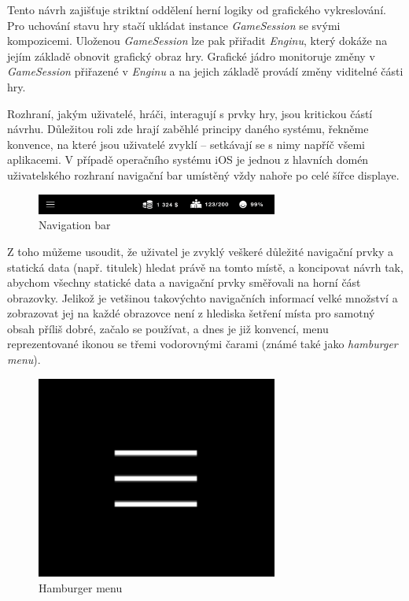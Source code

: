 \documentclass[twoside,12pt]{article}
\begin{document}
Tento návrh zajišťuje striktní oddělení herní logiky od grafického vykreslování. Pro uchování stavu hry stačí ukládat instance \textit{GameSession} se svými kompozicemi. Uloženou \textit{GameSession} lze pak přiřadit \textit{Enginu}, který dokáže na jejím základě obnovit grafický obraz hry. Grafické jádro monitoruje změny v \textit{GameSession} přiřazené v \textit{Enginu} a na jejich základě provádí změny viditelné části hry. 


Rozhraní, jakým uživatelé, hráči, interagují s prvky hry, jsou kritickou částí návrhu. Důležitou roli zde hrají zaběhlé principy daného systému, řekněme konvence, na které jsou uživatelé zvyklí -- setkávají se s nimy napříč všemi aplikacemi. V případě operačního systému iOS je jednou z hlavních domén uživatelského rozhraní navigační bar umístěný vždy nahoře po celé šířce displaye.    

\begin{figure}[H]
\centering
    \includegraphics[width=300px, center]{images/nav_bar_iphone.png}
\captionsetup{justification=centering}
    \caption{Navigation bar}
    \label{navigation_bar}
\end{figure}

Z toho můžeme usoudit, že uživatel je zvyklý veškeré důležité navigační prvky a statická data (např. titulek) hledat právě na tomto místě, a koncipovat návrh tak, abychom všechny statické data a navigační prvky směřovali na horní část obrazovky. Jelikož je vetšinou takovýchto navigačních informací velké množství a zobrazovat jej na každé obrazovce není z hlediska šetření místa pro samotný obsah příliš dobré, začalo se používat, a dnes je již konvencí, menu reprezentované ikonou se třemi vodorovnými čarami (známé také jako \textit{hamburger menu}). 

\begin{figure}[H]
\centering
    \includegraphics[width=300px, center]{images/hamburger_menu.png}
\captionsetup{justification=centering}
    \caption{Hamburger menu}
    \label{hamburger-menu}
\end{figure}
\end{document}
